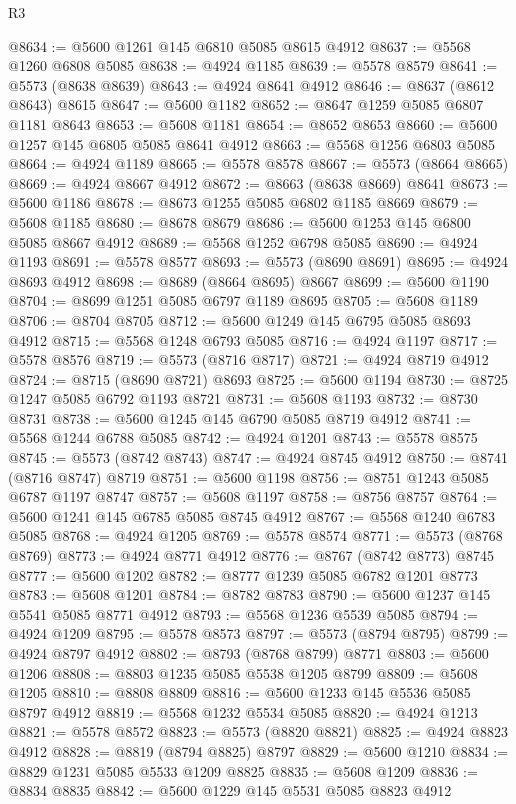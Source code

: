 \begin{lexlean}{R3}
\begin{coremodule}
@8634 := @5600 @1261 @145 @6810 @5085 @8615 @4912
@8637 := @5568 @1260 @6808 @5085
@8638 := @4924 @1185
@8639 := @5578 @8579
@8641 := @5573 (@8638 @8639)
@8643 := @4924 @8641 @4912
@8646 := @8637 (@8612 @8643) @8615
@8647 := @5600 @1182
@8652 := @8647 @1259 @5085 @6807 @1181 @8643
@8653 := @5608 @1181
@8654 := @8652 @8653
@8660 := @5600 @1257 @145 @6805 @5085 @8641 @4912
@8663 := @5568 @1256 @6803 @5085
@8664 := @4924 @1189
@8665 := @5578 @8578
@8667 := @5573 (@8664 @8665)
@8669 := @4924 @8667 @4912
@8672 := @8663 (@8638 @8669) @8641
@8673 := @5600 @1186
@8678 := @8673 @1255 @5085 @6802 @1185 @8669
@8679 := @5608 @1185
@8680 := @8678 @8679
@8686 := @5600 @1253 @145 @6800 @5085 @8667 @4912
@8689 := @5568 @1252 @6798 @5085
@8690 := @4924 @1193
@8691 := @5578 @8577
@8693 := @5573 (@8690 @8691)
@8695 := @4924 @8693 @4912
@8698 := @8689 (@8664 @8695) @8667
@8699 := @5600 @1190
@8704 := @8699 @1251 @5085 @6797 @1189 @8695
@8705 := @5608 @1189
@8706 := @8704 @8705
@8712 := @5600 @1249 @145 @6795 @5085 @8693 @4912
@8715 := @5568 @1248 @6793 @5085
@8716 := @4924 @1197
@8717 := @5578 @8576
@8719 := @5573 (@8716 @8717)
@8721 := @4924 @8719 @4912
@8724 := @8715 (@8690 @8721) @8693
@8725 := @5600 @1194
@8730 := @8725 @1247 @5085 @6792 @1193 @8721
@8731 := @5608 @1193
@8732 := @8730 @8731
@8738 := @5600 @1245 @145 @6790 @5085 @8719 @4912
@8741 := @5568 @1244 @6788 @5085
@8742 := @4924 @1201
@8743 := @5578 @8575
@8745 := @5573 (@8742 @8743)
@8747 := @4924 @8745 @4912
@8750 := @8741 (@8716 @8747) @8719
@8751 := @5600 @1198
@8756 := @8751 @1243 @5085 @6787 @1197 @8747
@8757 := @5608 @1197
@8758 := @8756 @8757
@8764 := @5600 @1241 @145 @6785 @5085 @8745 @4912
@8767 := @5568 @1240 @6783 @5085
@8768 := @4924 @1205
@8769 := @5578 @8574
@8771 := @5573 (@8768 @8769)
@8773 := @4924 @8771 @4912
@8776 := @8767 (@8742 @8773) @8745
@8777 := @5600 @1202
@8782 := @8777 @1239 @5085 @6782 @1201 @8773
@8783 := @5608 @1201
@8784 := @8782 @8783
@8790 := @5600 @1237 @145 @5541 @5085 @8771 @4912
@8793 := @5568 @1236 @5539 @5085
@8794 := @4924 @1209
@8795 := @5578 @8573
@8797 := @5573 (@8794 @8795)
@8799 := @4924 @8797 @4912
@8802 := @8793 (@8768 @8799) @8771
@8803 := @5600 @1206
@8808 := @8803 @1235 @5085 @5538 @1205 @8799
@8809 := @5608 @1205
@8810 := @8808 @8809
@8816 := @5600 @1233 @145 @5536 @5085 @8797 @4912
@8819 := @5568 @1232 @5534 @5085
@8820 := @4924 @1213
@8821 := @5578 @8572
@8823 := @5573 (@8820 @8821)
@8825 := @4924 @8823 @4912
@8828 := @8819 (@8794 @8825) @8797
@8829 := @5600 @1210
@8834 := @8829 @1231 @5085 @5533 @1209 @8825
@8835 := @5608 @1209
@8836 := @8834 @8835
@8842 := @5600 @1229 @145 @5531 @5085 @8823 @4912

\end{coremodule}
\end{lexlean}
